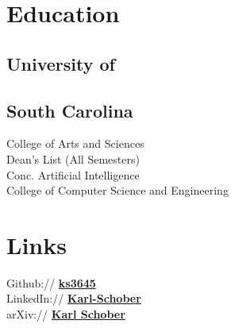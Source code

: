 \documentclass[no-math]{deedy-resume-openfont}
\begin{document}
	
	\lastupdated
	
	
	
	\begin{minipage}[t]{0.33\textwidth} 
		
		
		\section{Education} 

		\subsection{University of }
		\subsection{South Carolina}
		College of Arts and Sciences \\
		Dean's List (All Semesters) \\
		Conc. Artificial Intelligence \\
		College of Computer Science and Engineering
		\sectionsep
		
		
		\section{Links} 
		Github:// \href{https://github.com/ks3645}{\bf ks3645} \\
		LinkedIn://  \href{https://www.linkedin.com/in/karl-schober/}{\bf Karl-Schober} \\
		arXiv://  \href{https://arxiv.org/search/?searchtype=author\&query=Schober\%2C+Karl}{\bf Karl Schober} \\
		

\end{minipage}
\end{document}

